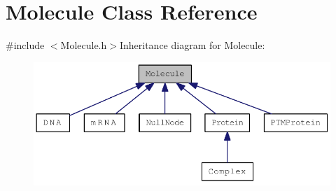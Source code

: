 \hypertarget{classMolecule}{
\section{Molecule Class Reference}
\label{classMolecule}
}


{\ttfamily \#include $<$Molecule.h$>$}Inheritance diagram for Molecule:\nopagebreak
\begin{figure}[H]
\begin{center}
\leavevmode
\includegraphics[width=388pt]{classMolecule__inherit__graph}
\end{center}
\end{figure}
